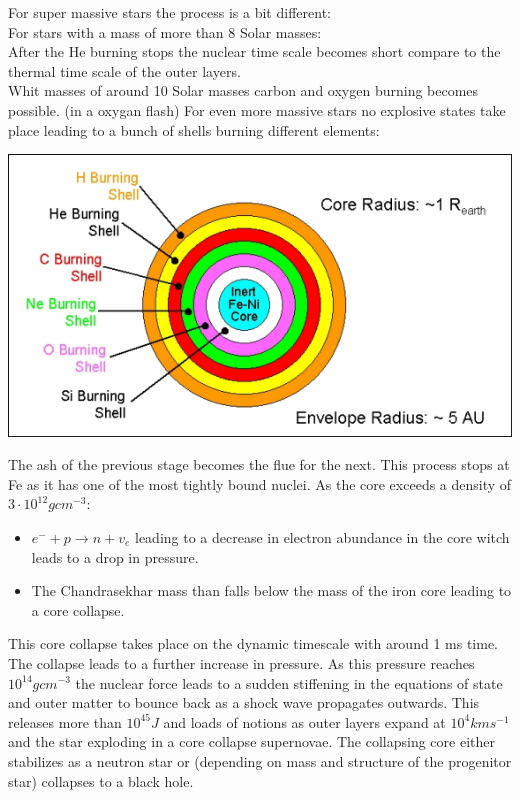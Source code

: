 \documentclass[11pt,a4paper]{article}
\begin{document}
For super massive stars the process is a bit different: \\
For stars with a mass of more than 8 Solar masses: \\ 
After the He burning stops the nuclear time scale becomes short compare to the thermal time scale of the outer layers.\\
Whit masses of around 10 Solar masses carbon and oxygen burning becomes possible. (in a oxygan flash)
For even more massive stars no explosive states take place leading to a bunch of shells burning different elements: 
\begin{center}
    \includegraphics[width=0.5\linewidth]{screenshot_2024-01-23-131219.png}
\end{center}
The ash of the previous stage becomes the flue for the next.
This process stops at Fe as it has one of the most tightly bound nuclei. 
As the core exceeds a density of $3 \cdot 10^{12} gcm^{-3}$: 
\begin{itemize}
    \item $e^- + p \rightarrow n + v_e  $ leading to a decrease in electron abundance in the core witch leads to a drop in pressure. 
    \item The Chandrasekhar mass than falls below the mass of the iron core leading to a core collapse. 
\end{itemize}
This core collapse takes place on the dynamic timescale with around 1 ms time.
The collapse leads to a further increase in pressure. 
As this pressure reaches $10^{14} gcm^{-3}$ the nuclear force leads to a sudden stiffening in the equations of state and outer matter to bounce back as a shock wave propagates outwards.
This releases more than $10^45 J$ and loads of notions as outer layers expand at $10^4 kms^{-1}$ and the star exploding in a core collapse supernovae.
The collapsing core either stabilizes as a neutron star or (depending on
mass and structure of the progenitor star) collapses to a black hole.
\end{document}

